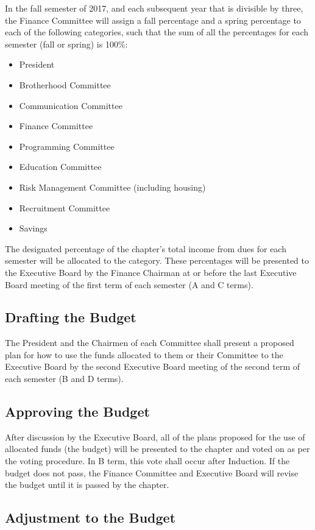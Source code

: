 In the fall semester of 2017, and each subsequent year that is divisible by
three, the Finance Committee will assign a fall percentage and a spring
percentage to each of the following categories, such that the sum of all the
percentages for each semester (fall or spring) is 100\%:
\begin{itemize}
    \item President 
    \item Brotherhood Committee
    \item Communication Committee
    \item Finance Committee
    \item Programming Committee
    \item Education Committee
    \item Risk Management Committee (including housing)
    \item Recruitment Committee
    \item Savings
\end{itemize}
The designated percentage of the chapter’s total income
from dues for each semester will be allocated to the category.
These percentages will be presented to the Executive Board by the Finance
Chairman at or before the last Executive Board meeting of the first term of
each semester (A and C terms).

\subsection{Drafting the Budget}

The President and the Chairmen of each Committee shall present a proposed plan
for how to use the funds allocated to them or their Committee to the Executive
Board by the second Executive Board meeting of the second term of each semester
(B and D terms).

\subsection{Approving the Budget}

After discussion by the Executive Board, all of the plans proposed for the use
of allocated funds (the budget) will be presented to the chapter and voted on
as per the voting procedure.
In B term, this vote shall occur after Induction.
If the budget does not pass, the Finance Committee and Executive Board will
revise the budget until it is passed by the chapter.

\subsection{Adjustment to the Budget}

